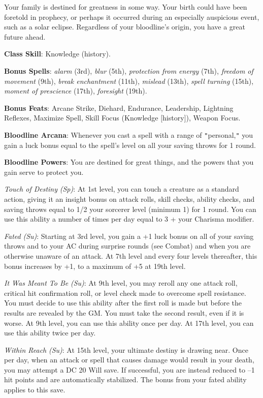 				
Your family is destined for greatness in some way. Your birth could have been foretold in prophecy, or perhaps it occurred during an especially auspicious event, such as a solar eclipse. Regardless of your bloodline's origin, you have a great future ahead.
				
\textbf{Class Skill}: Knowledge (history).
				
\textbf{Bonus Spells}:\textit{ alarm} (3rd), \textit{blur} (5th), \textit{protection from energy} (7th), \textit{freedom of movement} (9th), \textit{break enchantment }(11th), \textit{mislead} (13th), \textit{spell turning} (15th), \textit{moment of prescience }(17th), \textit{foresight} (19th).
				
\textbf{Bonus Feats}: Arcane Strike, Diehard, Endurance, Leadership, Lightning Reflexes, Maximize Spell, Skill Focus (Knowledge \mbox{$[$}history\mbox{$]$}), Weapon Focus.
				
\textbf{Bloodline Arcana}: Whenever you cast a spell with a range of \texttt{{}"{}}personal,\texttt{{}"{}} you gain a luck bonus equal to the spell's level on all your saving throws for 1 round.
				
\textbf{Bloodline Powers}: You are destined for great things, and the powers that you gain serve to protect you.
				
\textit{Touch of Destiny} \textit{(Sp)}: At 1st level, you can touch a creature as a standard action, giving it an insight bonus on attack rolls, skill checks, ability checks, and saving throws equal to 1/2 your sorcerer level (minimum 1) for 1 round. You can use this ability a number of times per day equal to 3 + your Charisma modifier.
				
\textit{Fated} \textit{(Su)}: Starting at 3rd level, you gain a +1 luck bonus on all of your saving throws and to your AC during surprise rounds (see Combat) and when you are otherwise unaware of an attack. At 7th level and every four levels thereafter, this bonus increases by +1, to a maximum of +5 at 19th level.
				
\textit{It Was Meant To Be} \textit{(Su)}: At 9th level, you may reroll any one attack roll, critical hit confirmation roll, or level check made to overcome spell resistance. You must decide to use this ability after the first roll is made but before the results are revealed by the GM. You must take the second result, even if it is worse. At 9th level, you can use this ability once per day. At 17th level, you can use this ability twice per day.
				
\textit{Within Reach} \textit{(Su)}: At 15th level, your ultimate destiny is drawing near. Once per day, when an attack or spell that causes damage would result in your death, you may attempt a DC 20 Will save. If successful, you are instead reduced to --1 hit points and are automatically stabilized. The bonus from your fated ability applies to this save.
				
